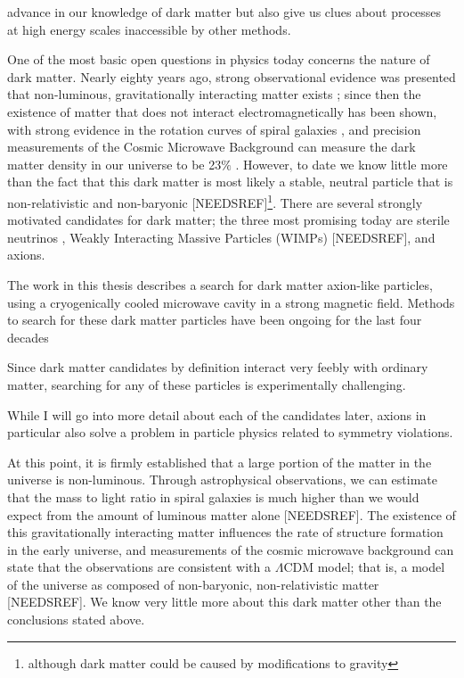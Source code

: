 \documentclass[12pt,twosides]{book}
\begin{document}
advance in our knowledge of dark matter but also give us clues about processes at high energy scales inaccessible by other methods.


One of the most basic open questions in physics today concerns the nature of dark matter. Nearly eighty years ago, strong observational evidence was presented that non-luminous, gravitationally interacting matter exists \cite{zwicky37}; since then the existence of matter that does not interact electromagnetically has been shown, with strong evidence in the rotation curves of spiral galaxies \cite{rubin80}, and precision measurements of the Cosmic Microwave Background can measure the dark matter density in our universe to be 23$\%$ \cite{planck14}. However, to date we know little more than the fact that this dark matter is most likely a stable, neutral particle that is non-relativistic and non-baryonic [NEEDSREF]\footnote{although dark matter could be caused by modifications to gravity}. There are several strongly motivated candidates for dark matter; the three most promising today are sterile neutrinos \cite{kusenko09}, Weakly Interacting Massive Particles (WIMPs) [NEEDSREF], and axions. 



The work in this thesis describes a search for dark matter axion-like particles, using a cryogenically cooled microwave cavity in a strong magnetic field. Methods to search for these dark matter particles have been ongoing for the last four decades

Since dark matter candidates by definition interact very feebly with ordinary matter, searching for any of these particles is experimentally challenging.  

While I will go into more detail about each of the candidates later, axions in particular also solve a problem in particle physics related to symmetry violations. 




At this point, it is firmly established that a large portion of the matter in the universe is non-luminous. Through astrophysical observations, we can estimate that the mass to light ratio in spiral galaxies is much higher than we would expect from the amount of luminous matter alone [NEEDSREF]. The existence of this gravitationally interacting matter influences the rate of structure formation in the early universe, and measurements of the cosmic microwave background can state that the observations are consistent with a $\Lambda$CDM model; that is, a model of the universe as composed of non-baryonic, non-relativistic matter [NEEDSREF]. We know very little more about this dark matter other than the conclusions stated above.
\end{document}
